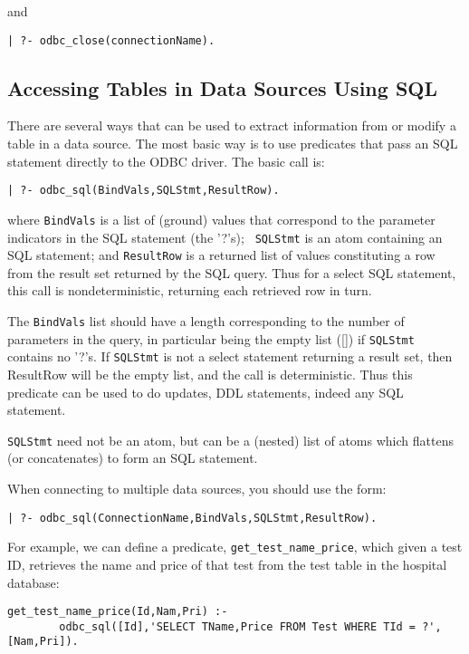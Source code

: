 and

\begin{verbatim}
| ?- odbc_close(connectionName).
\end{verbatim}

\subsection{Accessing Tables in Data Sources Using SQL}

There are several ways that can be used to extract information from or
modify a table in a data source.  The most basic way is to use
predicates that pass an SQL statement directly to the ODBC driver.
The basic call is:

\begin{verbatim}
| ?- odbc_sql(BindVals,SQLStmt,ResultRow).
\end{verbatim}
\noindent
where {\tt BindVals} is a list of (ground) values that correspond to
the parameter indicators in the SQL statement (the '?'s); {\tt
SQLStmt} is an atom containing an SQL statement; and {\tt ResultRow}
is a returned list of values constituting a row from the result set
returned by the SQL query.  Thus for a select SQL statement, this call
is nondeterministic, returning each retrieved row in turn.

The {\tt BindVals} list should have a length corresponding to the
number of parameters in the query, in particular being the empty list
([]) if {\tt SQLStmt} contains no '?'s.  If {\tt SQLStmt} is not a
select statement returning a result set, then ResultRow will be the
empty list, and the call is deterministic.  Thus this predicate can be
used to do updates, DDL statements, indeed any SQL statement.

{\tt SQLStmt} need not be an atom, but can be a (nested) list of atoms
which flattens (or concatenates) to form an SQL statement.

When connecting to multiple data sources, you should use the form:

\begin{verbatim}
| ?- odbc_sql(ConnectionName,BindVals,SQLStmt,ResultRow).
\end{verbatim}

For example, we can define a predicate, {\tt get\_test\_name\_price},
which given a test ID, retrieves the name and price of that test from
the test table in the hospital database:

\begin{verbatim}
get_test_name_price(Id,Nam,Pri) :-
        odbc_sql([Id],'SELECT TName,Price FROM Test WHERE TId = ?', [Nam,Pri]).
\end{verbatim}

